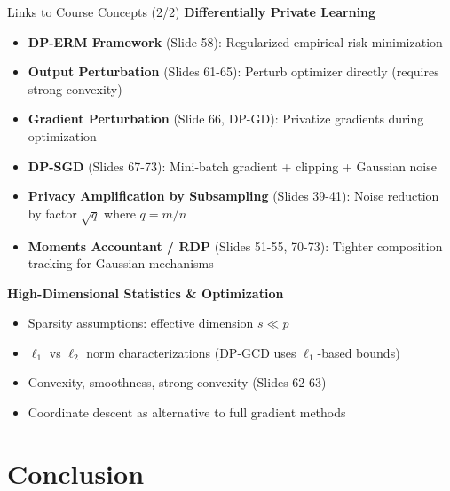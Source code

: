 \documentclass[10pt]{beamer}
\begin{document}
\begin{frame}{Links to Course Concepts (2/2)}
\textbf{Differentially Private Learning}
\begin{itemize}
\item \textbf{DP-ERM Framework} (Slide 58): Regularized empirical risk minimization
\item \textbf{Output Perturbation} (Slides 61-65): Perturb optimizer directly (requires strong convexity)
\item \textbf{Gradient Perturbation} (Slide 66, DP-GD): Privatize gradients during optimization
\item \textbf{DP-SGD} (Slides 67-73): Mini-batch gradient + clipping + Gaussian noise
\item \textbf{Privacy Amplification by Subsampling} (Slides 39-41): Noise reduction by factor $\sqrt{q}$ where $q = m/n$
\item \textbf{Moments Accountant / RDP} (Slides 51-55, 70-73): Tighter composition tracking for Gaussian mechanisms
\end{itemize}

\vspace{0.5em}
\textbf{High-Dimensional Statistics \& Optimization}
\begin{itemize}
\item Sparsity assumptions: effective dimension $s \ll p$
\item $\ell_1$ vs $\ell_2$ norm characterizations (DP-GCD uses $\ell_1$-based bounds)
\item Convexity, smoothness, strong convexity (Slides 62-63)
\item Coordinate descent as alternative to full gradient methods
\end{itemize}
\end{frame}

\section{Conclusion}
\end{document}
